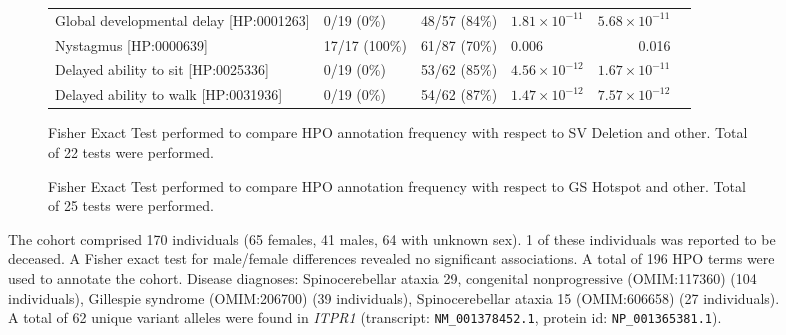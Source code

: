 \begin{figure}[htbp]
\begin{subfigure}[b]{0.95\textwidth}
{\begin{tabular}{llllrr}
Global developmental delay [HP:0001263] & 0/19 (0\%) & 48/57 (84\%) & $1.81\times 10^{-11}$ & $5.68\times 10^{-11}$\\
Nystagmus [HP:0000639] & 17/17 (100\%) & 61/87 (70\%) & 0.006 & 0.016\\
Delayed ability to sit [HP:0025336] & 0/19 (0\%) & 53/62 (85\%) & $4.56\times 10^{-12}$ & $1.67\times 10^{-11}$\\
Delayed ability to walk [HP:0031936] & 0/19 (0\%) & 54/62 (87\%) & $1.47\times 10^{-12}$ & $7.57\times 10^{-12}$\\
\bottomrule
\end{tabular}
}
\captionsetup{justification=raggedright,singlelinecheck=false}
\caption{Fisher Exact Test performed to compare HPO annotation frequency with respect to SV Deletion and other. Total of
        22 tests were performed.}
\end{subfigure}
\vspace{0.2em}
\begin{subfigure}[b]{0.95\textwidth}
\centering
{}
\captionsetup{justification=raggedright,singlelinecheck=false}
\caption{Fisher Exact Test performed to compare HPO annotation frequency with respect to GS Hotspot and other. Total of
        25 tests were performed. }
\end{subfigure}

\vspace{0.2em}

\caption{The cohort comprised 170 individuals (65 females, 41 males, 64 with unknown sex). 1 of these individuals was reported to be deceased. 
A Fisher exact test for male/female differences revealed no significant associations.
A total of 196 HPO terms were used to annotate the cohort. Disease diagnoses: Spinocerebellar ataxia 29, congenital nonprogressive (OMIM:117360) (104 individuals), Gillespie syndrome (OMIM:206700) (39 individuals), Spinocerebellar ataxia 15 (OMIM:606658) (27 individuals). A total of 62 unique variant alleles were found in \textit{ITPR1} (transcript: \texttt{NM\_001378452.1}, protein id: \texttt{NP\_001365381.1}).}
\end{figure}
